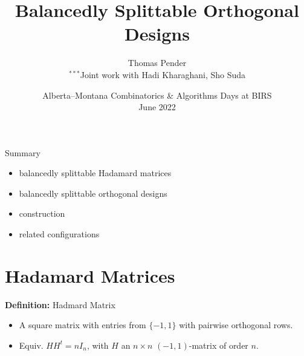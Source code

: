 \documentclass{beamer}
\title[Splittable ODs]{Balancedly Splittable Orthogonal Designs}
\author[T. Pender]{Thomas Pender\\\scriptsize $^{***}$Joint work with Hadi Kharaghani, Sho Suda}
\institute[U of L]{Department of Mathematics and Computer Science\\University of
Lethbridge}
\date[BIRS June 2022]{Alberta--Montana Combinatorics \& Algorithms Days at BIRS\\June 2022}
\begin{document}

{
\begin{frame}
  \titlepage
\end{frame}
}

\begin{frame}{Summary}

  \begin{itemize}
    \item balancedly splittable Hadamard matrices
    \item balancedly splittable orthogonal designs
    \item construction
    \item related configurations
  \end{itemize}
  
\end{frame}


\section{Hadamard Matrices}

\begin{frame}

  \begin{block}{{\bf Definition:} Hadmard Matrix}
    \begin{itemize}
      \item A square matrix with entries from $\{-1,1\}$ with pairwise
        orthogonal rows.
      \item Equiv. $HH^t = nI_n$, with $H$ an $n \times n$ $(-1,1)$-matrix of
        order $n$.
    \end{itemize}
  \end{block}

\end{frame}
\end{document}
